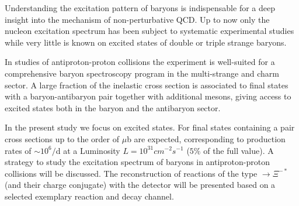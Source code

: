 Understanding the excitation pattern of baryons is indispensable for a deep insight into the mechanism of non-perturbative QCD. 
Up to now only the nucleon excitation spectrum has been subject to systematic experimental studies while very little is known 
on excited states of double or triple strange baryons.

\noindent In studies of antiproton-proton collisions the \panda experiment is well-suited for a comprehensive baryon spectroscopy program
in the multi-strange and charm sector. 
A large fraction of the inelastic \pbarpSystem cross section is associated to final states with a baryon-antibaryon pair together with 
additional mesons, giving access to excited states both in the baryon and the antibaryon sector.

\noindent In the present study we focus on excited \cascade states. For final states containing a \cascade\anticascade pair cross sections 
up to the order of $\mu$b are expected, corresponding to production rates of $\sim 10^6/$d at a Luminosity $L=10^{31} \unit{cm}^{-2} \unit{s}^{-1}$
 ($5\%$ of the full value).
A strategy to study the excitation spectrum of \cascade baryons in antiproton-proton collisions will be discussed. The reconstruction of 
reactions of the type \pbarpSystem $\rightarrow \Xi^{-*}$\anticascade (and their charge conjugate) with the \panda detector will be presented 
based on a selected exemplary reaction and decay channel.